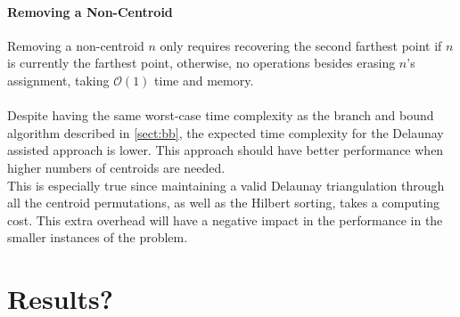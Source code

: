 \paragraph{Removing a Non-Centroid}
Removing a non-centroid $n$ only requires recovering the second farthest point if $n$ is currently the farthest point, otherwise, no operations besides erasing $n$'s assignment, taking $\mathcal{O}(1)$ time and memory.

\paragraph{}
Despite having the same worst-case time complexity as the branch and bound algorithm described in \ref{sect:bb}, the expected time complexity for the Delaunay assisted approach is lower. This approach should have better performance when higher numbers of centroids are needed.\\
This is especially true since maintaining a valid Delaunay triangulation through all the centroid permutations, as well as the Hilbert sorting, takes a computing cost. This extra overhead will have a negative impact in the performance in the smaller instances of the problem.\\

\section{Results?}